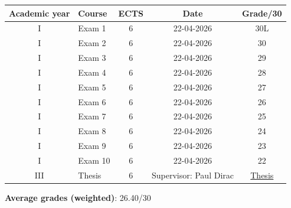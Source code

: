 \documentclass[a4paper]{article}
\begin{document}

\begin{table}[ht!]
    \centering
    \begin{tabular}{|c|p{}|c|c||c|}
        \bottomrule
        \rule{0ex}{3ex}
        \textbf{Academic year} & \textbf{Course} & \textbf{ECTS} & \textbf{Date} & \textbf{Grade/30} \\[1ex]
        \toprule
        \bottomrule
        \hline
        I & Exam 1 & 6 & 22-04-2026 & 30L \\
        \hline
        I & Exam 2 & 6 & 22-04-2026 & 30 \\
        \hline
        I & Exam 3 & 6 & 22-04-2026 & 29 \\
        \hline
        I & Exam 4 & 6 & 22-04-2026 & 28 \\
        \hline
        I & Exam 5 & 6 & 22-04-2026 & 27 \\
        \hline
        I & Exam 6 & 6 & 22-04-2026 & 26 \\
        \hline
        I & Exam 7 & 6 & 22-04-2026 & 25 \\
        \hline
        I & Exam 8 & 6 & 22-04-2026 & 24 \\
        \hline
        I & Exam 9 & 6 & 22-04-2026 & 23 \\
        \hline
        I & Exam 10 & 6 & 22-04-2026 & 22 \\
        \hline
        III & Thesis & 6 & Supervisor: Paul Dirac & \href{link}{Thesis} \\
        \toprule
    \end{tabular}
\end{table}
\hfill \textbf{Average grades (weighted)}: 26.40/30
\end{document}
